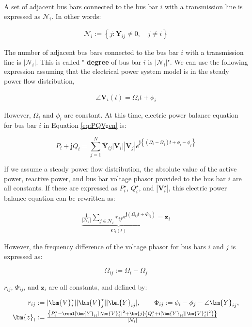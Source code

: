 \documentclass[graybox, envcountchap]{svmult}
\begin{document}
A set of adjacent bus bars connected to the bus bar $i$ with a transmission line is expressed as $\mathcal{N}_i$. 
In other words:

\begin{align*}
\mathcal{N}_i:=
\left\{
j : \bm{Y}_{ij} \neq 0,\quad j \neq i
\right\}
\end{align*}

The number of adjacent bus bars connected to the bus bar $i$ with a transmission line is $|\mathcal{N}_i|$.
This is called "\textbf{ degree} of bus bar $i$ is $|\mathcal{N}_i|$".
We can use the following expression assuming that the electrical power system model is in the steady power flow distribution, 

\begin{align*}
\angle \bm{V}_i (t) = \Omega_i t +\phi_i
\end{align*}

However, $\Omega_i$ and $\phi_i$ are constant. 
At this time, electric power balance equation for bus bar $i$ in Equation \ref{eq:PQVgen} is:

\[
P_i + \bm{j} Q_i = \sum_{j=1}^N \overline{\bm{Y}}_{ij} |\bm{V}_i| |\bm{V}_j|
e^{\bm{j} \left\{ ( \Omega_i - \Omega_j )t + \phi_i -\phi_j \right\}}
\]

If we assume a steady power flow distribution, the absolute value of the active power, reactive power, and bus bar voltage phasor provided to the bus bar $i$ are all constants.
If these are expressed as $P_i^{\star}$, $Q_i^{\star}$, and $|\bm{V}_i^{\star}|$, this electric power balance equation can be rewritten as:

\begin{align}\label{eq:sumcirc}
\underbrace{
\frac{1}{|\mathcal{N}_i|}\sum_{j \in \mathcal{N}_i } 
r_{ij}
e^{\bm{j} 
\left(
\Omega_{ij}t + 
\Phi_{ij}
\right) }
}_{\bm{C}_i (t)}
= \bm{z}_i
\end{align}

However, the frequency difference of the voltage phasor for bus bars $i$ and $j$ is expressed as:

\[
\Omega_{ij}:=\Omega_{i}-\Omega_{j}
\]

$r_{ij}$, $\Phi_{ij}$, and $\bm{z}_i$ are all constants, and defined by:

\begin{align*}
r_{ij} &:=|\bm{V}_i^{\star}| |\bm{V}_j^{\star}| |\bm{Y}_{ij}|, \qquad
\Phi_{ij} := \phi_i - \phi_j - \angle \bm{Y}_{ij},
\\
\bm{z}_i &:=  \tfrac{
\left\{
P_i^{\star} - \real[\bm{Y}_{ii}] |\bm{V}_i^{\star}|^2
+ \bm{j}
\left(
Q_i^{\star} + \imag [\bm{Y}_{ii}] |\bm{V}_i^{\star}|^2
\right)
\right\}
}
{|\mathcal{N}_i|}
\end{align*}
\end{document}
